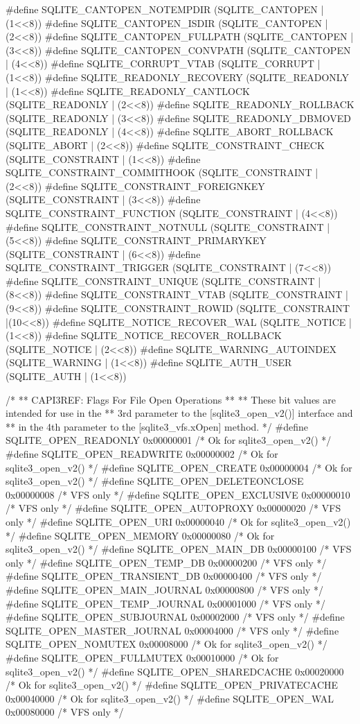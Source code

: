 \begin{Codex}[label=sqlite3.h,numbers=left]
{#define SQLITE_CANTOPEN_NOTEMPDIR      (SQLITE_CANTOPEN | (1<<8))
#define SQLITE_CANTOPEN_ISDIR          (SQLITE_CANTOPEN | (2<<8))
#define SQLITE_CANTOPEN_FULLPATH       (SQLITE_CANTOPEN | (3<<8))
#define SQLITE_CANTOPEN_CONVPATH       (SQLITE_CANTOPEN | (4<<8))
#define SQLITE_CORRUPT_VTAB            (SQLITE_CORRUPT | (1<<8))
#define SQLITE_READONLY_RECOVERY       (SQLITE_READONLY | (1<<8))
#define SQLITE_READONLY_CANTLOCK       (SQLITE_READONLY | (2<<8))
#define SQLITE_READONLY_ROLLBACK       (SQLITE_READONLY | (3<<8))
#define SQLITE_READONLY_DBMOVED        (SQLITE_READONLY | (4<<8))
#define SQLITE_ABORT_ROLLBACK          (SQLITE_ABORT | (2<<8))
#define SQLITE_CONSTRAINT_CHECK        (SQLITE_CONSTRAINT | (1<<8))
#define SQLITE_CONSTRAINT_COMMITHOOK   (SQLITE_CONSTRAINT | (2<<8))
#define SQLITE_CONSTRAINT_FOREIGNKEY   (SQLITE_CONSTRAINT | (3<<8))
#define SQLITE_CONSTRAINT_FUNCTION     (SQLITE_CONSTRAINT | (4<<8))
#define SQLITE_CONSTRAINT_NOTNULL      (SQLITE_CONSTRAINT | (5<<8))
#define SQLITE_CONSTRAINT_PRIMARYKEY   (SQLITE_CONSTRAINT | (6<<8))
#define SQLITE_CONSTRAINT_TRIGGER      (SQLITE_CONSTRAINT | (7<<8))
#define SQLITE_CONSTRAINT_UNIQUE       (SQLITE_CONSTRAINT | (8<<8))
#define SQLITE_CONSTRAINT_VTAB         (SQLITE_CONSTRAINT | (9<<8))
#define SQLITE_CONSTRAINT_ROWID        (SQLITE_CONSTRAINT |(10<<8))
#define SQLITE_NOTICE_RECOVER_WAL      (SQLITE_NOTICE | (1<<8))
#define SQLITE_NOTICE_RECOVER_ROLLBACK (SQLITE_NOTICE | (2<<8))
#define SQLITE_WARNING_AUTOINDEX       (SQLITE_WARNING | (1<<8))
#define SQLITE_AUTH_USER               (SQLITE_AUTH | (1<<8))

/*
** CAPI3REF: Flags For File Open Operations
**
** These bit values are intended for use in the
** 3rd parameter to the [sqlite3_open_v2()] interface and
** in the 4th parameter to the [sqlite3_vfs.xOpen] method.
*/
#define SQLITE_OPEN_READONLY         0x00000001  /* Ok for sqlite3_open_v2() */
#define SQLITE_OPEN_READWRITE        0x00000002  /* Ok for sqlite3_open_v2() */
#define SQLITE_OPEN_CREATE           0x00000004  /* Ok for sqlite3_open_v2() */
#define SQLITE_OPEN_DELETEONCLOSE    0x00000008  /* VFS only */
#define SQLITE_OPEN_EXCLUSIVE        0x00000010  /* VFS only */
#define SQLITE_OPEN_AUTOPROXY        0x00000020  /* VFS only */
#define SQLITE_OPEN_URI              0x00000040  /* Ok for sqlite3_open_v2() */
#define SQLITE_OPEN_MEMORY           0x00000080  /* Ok for sqlite3_open_v2() */
#define SQLITE_OPEN_MAIN_DB          0x00000100  /* VFS only */
#define SQLITE_OPEN_TEMP_DB          0x00000200  /* VFS only */
#define SQLITE_OPEN_TRANSIENT_DB     0x00000400  /* VFS only */
#define SQLITE_OPEN_MAIN_JOURNAL     0x00000800  /* VFS only */
#define SQLITE_OPEN_TEMP_JOURNAL     0x00001000  /* VFS only */
#define SQLITE_OPEN_SUBJOURNAL       0x00002000  /* VFS only */
#define SQLITE_OPEN_MASTER_JOURNAL   0x00004000  /* VFS only */
#define SQLITE_OPEN_NOMUTEX          0x00008000  /* Ok for sqlite3_open_v2() */
#define SQLITE_OPEN_FULLMUTEX        0x00010000  /* Ok for sqlite3_open_v2() */
#define SQLITE_OPEN_SHAREDCACHE      0x00020000  /* Ok for sqlite3_open_v2() */
#define SQLITE_OPEN_PRIVATECACHE     0x00040000  /* Ok for sqlite3_open_v2() */
#define SQLITE_OPEN_WAL              0x00080000  /* VFS only */

}
\end{Codex}
